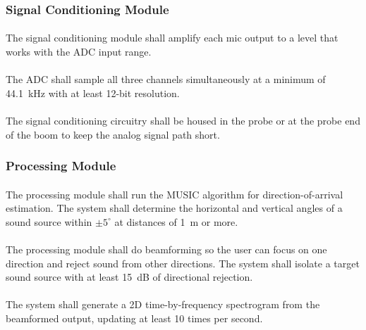 \subsubsection{Signal Conditioning Module}

\paragraph{}
The signal conditioning module shall amplify each mic output to a level that works with the ADC input range.

\paragraph{}
The ADC shall sample all three channels simultaneously at a minimum of 44.1~kHz with at least 12-bit resolution.

\paragraph{}
The signal conditioning circuitry shall be housed in the probe or at the probe end of the boom to keep the analog signal path short.

\subsubsection{Processing Module}

\paragraph{} \label{musicReq}
The processing module shall run the MUSIC algorithm for direction-of-arrival estimation.  The system shall determine the horizontal and vertical angles of a sound source within $\pm 5^{\circ}$ at distances of 1~m or more.

\paragraph{} \label{beamform}
The processing module shall do beamforming so the user can focus on one direction and reject sound from other directions.  The system shall isolate a target sound source with at least 15~dB of directional rejection.

\paragraph{}
The system shall generate a 2D time-by-frequency spectrogram from the beamformed output, updating at least 10 times per second.

